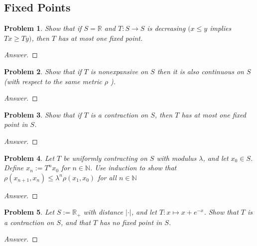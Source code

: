 \documentclass{article}
\newtheorem{problem}{Problem}[section]
\begin{document}
\subsection{Fixed Points}
\begin{problem} Show that if $S=\mathbb{R}$ and $T: S \rightarrow S$ is decreasing $(x \leq y$ implies $T x \geq T y)$, then $T$ has at most one fixed point.
\end{problem}
\begin{proof}[Answer]
    
\end{proof}
\begin{problem} Show that if $T$ is nonexpansive on $S$ then it is also continuous on $S$ (with respect to the same metric $\rho$ ).
\end{problem}
\begin{proof}[Answer]
    
\end{proof}
\begin{problem} Show that if $T$ is a contraction on $S$, then $T$ has at most one fixed point in $S$.
\end{problem}
\begin{proof}[Answer]
    
\end{proof}
\begin{problem} Let $T$ be uniformly contracting on $S$ with modulus $\lambda$, and let $x_{0} \in S$. Define $x_{n}:=T^{n} x_{0}$ for $n \in \mathbb{N}$. Use induction to show that $\rho\left(x_{n+1}, x_{n}\right) \leq \lambda^{n} \rho\left(x_{1}, x_{0}\right)$
for all $n \in \mathbb{N}$
\end{problem}
\begin{proof}[Answer]
    
\end{proof}
\begin{problem} Let $S:=\mathbb{R}_{+}$ with distance $|\cdot|$, and let $T: x \mapsto x+e^{-x}$. Show that $T$ is a contraction on $S$, and that $T$ has no fixed point in $S$.
\end{problem}
\begin{proof}[Answer]
    
\end{proof}
\end{document}
